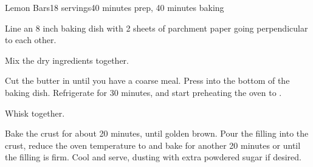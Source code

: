 \documentclass[../Cookbook.tex]{subfiles}
\begin{document}
\begin{recipe}{Lemon Bars}{18 servings}{40 minutes prep, 40 minutes baking}

Line an 8 inch baking dish with 2 sheets of parchment paper going perpendicular to each other.

Mix the dry ingredients together.

Cut the butter in until you have a coarse meal. Press into the bottom of the baking dish. Refrigerate for 30 minutes, and start preheating the oven to .

Whisk together.

Bake the crust for about 20 minutes, until golden brown. Pour the filling into the crust, reduce the oven temperature to  and bake for another 20 minutes or until the filling is firm. Cool and serve, dusting with extra powdered sugar if desired.


\end{recipe}
\end{document}
